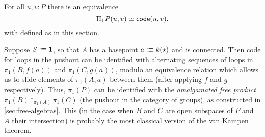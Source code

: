 \documentclass[hott-all.tex]{subfiles}
\begin{document}
% 
\begin{thm}
  For all $u,v:P$ there is an equivalence
  \[ \Pi_1P(u,v) \simeq \mathsf{code}(u,v). \]
  with \code defined as in this section.
\end{thm}
% 
% 
% 
% 
\begin{eg}
  Suppose $S\vcentcolon\equiv \mathbf{1}$, so that $A$ has a basepoint $a \vcentcolon\equiv k(\star)$ and is connected.
  Then code for loops in the pushout can be identified with alternating sequences of loops in $\pi_1(B,f(a))$ and $\pi_1(C,g(a))$, modulo an equivalence relation which allows us to slide elements of $\pi_1(A,a)$ between them (after applying $f$ and $g$ respectively).
  Thus, $\pi_1(P)$ can be identified with the \emph{amalgamated free product}
  $\pi_1(B) *_{\pi_1(A)} \pi_1(C)$ (the pushout in the category of groups), as constructed in \cref{sec:free-algebras}.
  This (in the case when $B$ and $C$ are open subspaces of $P$ and $A$ their intersection) is probably the most classical version of the van Kampen theorem.
\end{eg}
\end{document}

